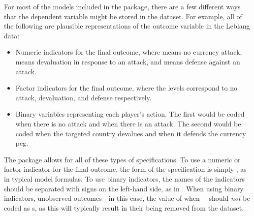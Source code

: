 \documentclass[article]{jss}
\begin{document}
For most of the models included in the  package, there are a few
different ways that the dependent variable might be stored in the dataset.  For
example, all of the following are plausible representations of the outcome
variable in the Leblang data:
\begin{itemize}
  \item Numeric indicators for the final outcome, where  means no
  currency attack,  means devaluation in response to an attack, and
   means defense against an attack.
  \item Factor indicators for the final outcome, where the levels correspond to
  no attack, devaluation, and defense respectively.
  \item Binary variables representing each player's action.  The first would be
  coded  when there is no attack and  when there is an attack.
  The second would be coded  when the targeted country devalues and
   when it defends the currency peg.
\end{itemize}
The  package allows for all of these types of specifications.  To use
a numeric or factor indicator for the final outcome, the form of the
specification is simply , as in typical model formulas.  To use
binary indicators, the names of the indicators should be separated with \code{+}
signs on the left-hand side, as in .  When using binary
indicators, unobserved outcomes---in this case, the value of  when
---should \emph{not} be coded as s, as this will
typically result in their being removed from the dataset.
\end{document}
